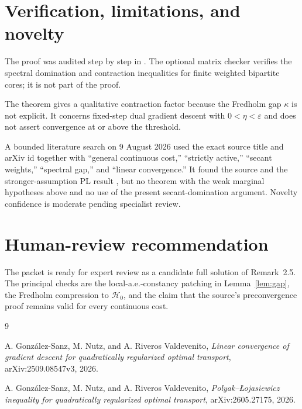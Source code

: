 \documentclass[11pt]{article}
\newcommand{\cH}{\mathcal{H}}
\newcommand{\eps}{\varepsilon}
\newcommand{\1}{\mathbf{1}}
\begin{document}
\section{Verification, limitations, and novelty}

The proof was audited step by step in .  The optional
matrix checker  verifies the spectral
domination and contraction inequalities for finite weighted bipartite cores;
it is not part of the proof.

The theorem gives a qualitative contraction factor because the Fredholm gap
$\kappa$ is not explicit.  It concerns fixed-step dual gradient descent with
$0<\eta<\eps$ and does not assert convergence at or above the threshold.

A bounded literature search on 9 August 2026 used the exact source title and
arXiv id together with “general continuous cost,” “strictly active,” “secant
weights,” “spectral gap,” and “linear convergence.”  It found the source and
the stronger-assumption PL result \cite{GNRPL2026}, but no theorem with the
weak marginal hypotheses above and no use of the present secant-domination
argument.  Novelty confidence is moderate pending specialist review.

\section{Human-review recommendation}

The packet is ready for expert review as a candidate full solution of
Remark~2.5.  The principal checks are the local-a.e.-constancy patching in
Lemma~\ref{lem:gap}, the Fredholm compression to $\cH_0$, and the claim that
the source's preconvergence proof remains valid for every continuous cost.

\begin{thebibliography}{9}

A. Gonz\'alez-Sanz, M. Nutz, and A. Riveros Valdevenito,
\emph{Linear convergence of gradient descent for quadratically regularized
optimal transport}, arXiv:2509.08547v3, 2026.

A. Gonz\'alez-Sanz, M. Nutz, and A. Riveros Valdevenito,
\emph{Polyak--\L{}ojasiewicz inequality for quadratically regularized optimal
transport}, arXiv:2605.27175, 2026.

\end{thebibliography}
\end{document}
